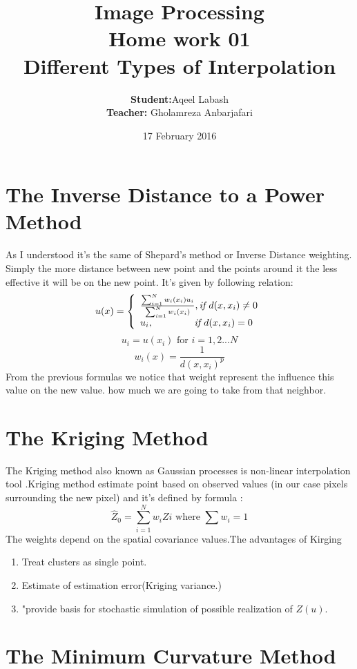 \documentclass{article}
\title{Image Processing\\
		Home work 01\\Different Types of Interpolation}
\author{\textbf{Student:}Aqeel Labash\\ \textbf{Teacher:} Gholamreza Anbarjafari}
\date{17 February 2016}
\begin{document}
	\maketitle
\begin{multicols*}{2}
{\centering	\section{The Inverse Distance to a Power Method}}
As I understood it's the same of Shepard's method or Inverse Distance weighting\cite{1}. Simply the more distance between new point and the points around it the less effective it will be on the new point. It's given by following relation:
 \[
u(x)=\left\{
 \begin{array}{ll}
 \frac{\sum_{i=1}^{N}w_i(x_i) u_i}{\sum_{i=1}^{N}w_i(x_i)} , \textit{if } d(x,x_i) \neq 0 \\
 u_i,\hspace{15mm} \textit{if } d(x,x_i) =0
 \end{array}
 \right.
 \]
\[u_i= u(x_i) \text{ for } i=1,2...N \]
\[ w_i(x) = \frac{1}{d(x,x_i)^p} \]
From the previous formulas we notice that weight represent the influence this value on the new value.
 how much we are going to take from that neighbor.
{\centering	\section {The Kriging Method}}
The Kriging method also known as Gaussian processes is non-linear interpolation tool \cite{3}.Kriging method estimate point based on observed values (in our case pixels surrounding the new pixel) and it's defined by formula \cite{2}:
\[\hat{Z}_0 = \sum_{i=1}^{N} w_iZi \text{ where } \sum w_i=1 \]
The weights depend on the spatial covariance values.The advantages of Kirging \cite{4}
\begin{enumerate}
	\item Treat clusters as single point.
	\item Estimate of estimation error(Kriging variance.)
	\item "provide basis for stochastic simulation of possible realization of \(Z(u)\). \cite{4}
\end{enumerate}
{\centering	\section{The Minimum Curvature Method}}
\begin{flushleft}


\end{flushleft}
\end{multicols*}
\end{document}
